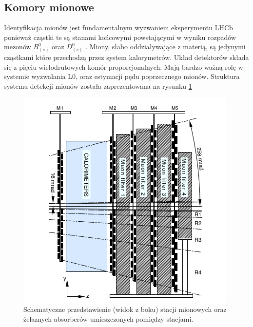 \subsection{Komory mionowe}
Identyfikacja mionów jest fundamentalnym wyzwaniem eksperymentu LHCb ponieważ cząstki te są stanami końcowymi powstającymi w wyniku rozpadów mezonów $B_{(s)}^0$ oraz $D_{(s)}^0$ . Miony, słabo oddziaływające z materią, są jedynymi cząstkami które przechodzą przez system kalorymetrów. Układ detektorów składa się z pięciu wielodrutowych komór proporcjonalnych. Mają bardzo ważną rolę w systemie wyzwalania L0, oraz estymacji pędu poprzecznego mionów. Struktura systemu detekcji mionów została zaprezentowana na rysunku \ref{fig:Muon}
\begin{figure}[H] 
  \centering
  \includegraphics[scale=0.6]{rozdzial2/Muon.png}
  \caption{Schematyczne przedstawienie (widok z boku) stacji mionowych oraz żelaznych absorberów umieszczonych pomiędzy stacjami.}
  \label{fig:Muon}
\end{figure}


